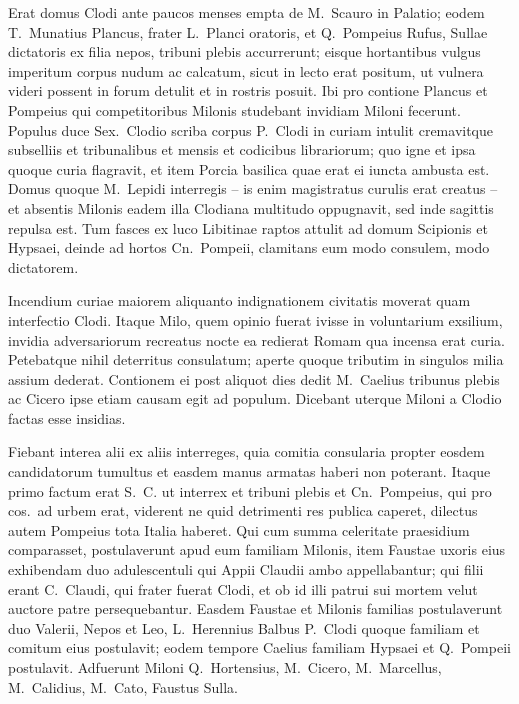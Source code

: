 Erat domus Clodi ante paucos menses empta de M.~Scauro in Palatio; eodem T.~Munatius Plancus, frater L.~Planci oratoris, et Q.~Pompeius Rufus, Sullae dictatoris ex filia nepos, tribuni plebis accurrerunt; eisque hortantibus vulgus imperitum corpus nudum ac calcatum, sicut in lecto erat positum, ut vulnera videri possent in forum detulit et in rostris posuit. Ibi pro contione Plancus et Pompeius qui competitoribus Milonis studebant invidiam Miloni fecerunt. Populus duce Sex.~Clodio scriba corpus P.~Clodi in curiam intulit cremavitque subselliis et tribunalibus et mensis et codicibus librariorum; quo igne et ipsa quoque curia flagravit, et item Porcia basilica quae erat ei iuncta ambusta est. Domus quoque M.~Lepidi interregis – is enim magistratus curulis erat creatus – et absentis Milonis eadem illa Clodiana multitudo oppugnavit, sed inde sagittis repulsa est. Tum fasces ex luco Libitinae raptos attulit ad domum Scipionis et Hypsaei, deinde ad hortos Cn.~Pompeii, clamitans eum modo consulem, modo dictatorem.

Incendium curiae maiorem aliquanto indignationem civitatis moverat quam interfectio Clodi. Itaque Milo, quem opinio fuerat ivisse in voluntarium exsilium, invidia adversariorum recreatus nocte ea redierat Romam qua incensa erat curia. Petebatque nihil deterritus consulatum; aperte quoque tributim in singulos milia assium dederat. Contionem ei post aliquot dies dedit M.~Caelius tribunus plebis ac Cicero ipse etiam causam egit ad populum. Dicebant uterque Miloni a Clodio factas esse insidias.

Fiebant interea alii ex aliis interreges, quia comitia consularia propter eosdem candidatorum tumultus et easdem manus armatas haberi non poterant. Itaque primo factum erat S.~C. ut interrex et tribuni plebis et Cn.~Pompeius, qui pro cos.\ ad urbem erat, viderent ne quid detrimenti res publica caperet, dilectus autem Pompeius tota Italia haberet. Qui cum summa celeritate praesidium comparasset, postulaverunt apud eum familiam Milonis, item Faustae uxoris eius exhibendam duo adulescentuli qui Appii Claudii ambo appellabantur; qui filii erant C.~Claudi, qui frater fuerat Clodi, et ob id illi patrui sui mortem velut auctore patre persequebantur. Easdem Faustae et Milonis familias postulaverunt duo Valerii, Nepos et Leo, L.~Herennius Balbus P.~Clodi quoque familiam et comitum eius postulavit; eodem tempore Caelius familiam Hypsaei et Q.~Pompeii postulavit. Adfuerunt Miloni Q.~Hortensius, M.~Cicero, M.~Marcellus, M.~Calidius, M.~Cato, Faustus Sulla. 

